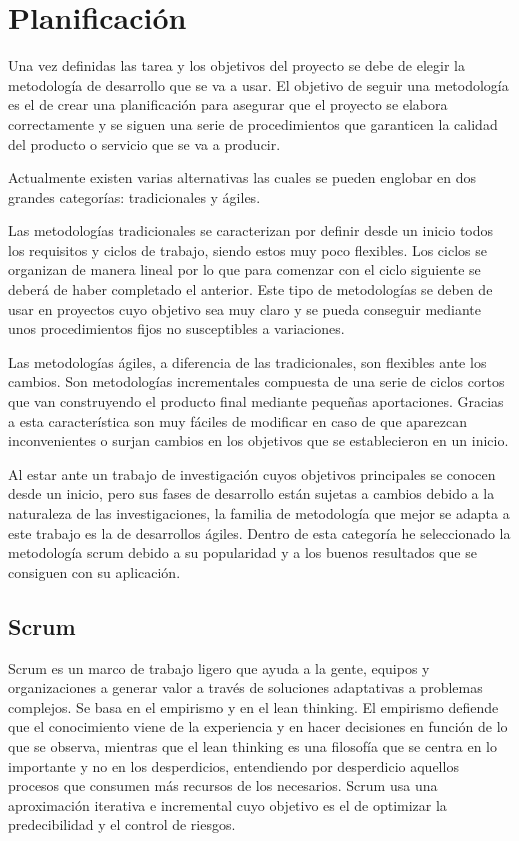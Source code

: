 \chapter{Planificación} \label{planificacion}
Una vez definidas las tarea y los objetivos del proyecto se debe de elegir la metodología de desarrollo que se va a usar. El objetivo de seguir una metodología es el de crear una planificación para asegurar que el proyecto se elabora correctamente y se siguen una serie de procedimientos que garanticen la calidad del producto o servicio que se va a producir. 

Actualmente existen varias alternativas las cuales se pueden englobar en dos grandes categorías: tradicionales y ágiles. 

Las metodologías tradicionales se caracterizan por definir desde un inicio todos los requisitos y ciclos de trabajo, siendo estos muy poco flexibles. Los ciclos se organizan de manera lineal por lo que para comenzar con el ciclo siguiente se deberá de haber completado el anterior. Este tipo de metodologías se deben de usar en proyectos cuyo objetivo sea muy claro y se pueda conseguir mediante unos procedimientos fijos no susceptibles a variaciones.

Las metodologías ágiles, a diferencia de las tradicionales, son flexibles ante los cambios. Son metodologías incrementales compuesta de una serie de ciclos cortos que van construyendo el producto final mediante pequeñas aportaciones. Gracias a esta característica son muy fáciles de modificar en caso de que aparezcan inconvenientes o surjan cambios en los objetivos que se establecieron en un inicio.  

Al estar ante un trabajo de investigación cuyos objetivos principales se conocen desde un inicio, pero sus fases de desarrollo están sujetas a cambios debido a la naturaleza de las investigaciones, la familia de metodología que mejor se adapta a este trabajo es la de desarrollos ágiles. Dentro de esta categoría he seleccionado la metodología scrum debido a su popularidad y a los buenos resultados que se consiguen con su aplicación.
\section{Scrum}
Scrum \cite{book} es un marco de trabajo ligero que ayuda a la gente, equipos y organizaciones a generar valor a través de soluciones adaptativas a problemas complejos. Se basa en el empirismo y en el lean thinking. El empirismo defiende que el conocimiento viene de la experiencia y en hacer decisiones en función de lo que se observa, mientras que el lean thinking es una filosofía que se centra en lo importante y no en los desperdicios, entendiendo por desperdicio aquellos procesos que consumen más recursos de los necesarios. Scrum usa una aproximación iterativa e incremental cuyo objetivo es el de optimizar la predecibilidad y el control de riesgos. 

